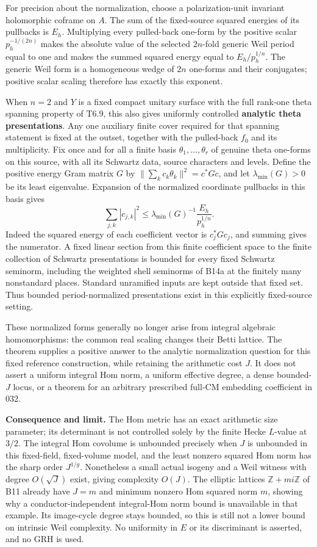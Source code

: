For precision about the normalization, choose a polarization-unit invariant holomorphic coframe on \(A\). The sum of the fixed-source squared energies of its pullbacks is \(E_h\). Multiplying every pulled-back one-form by the positive scalar \(p_h^{-1/(2n)}\) makes the absolute value of the selected \(2n\)-fold generic Weil period equal to one and makes the summed squared energy equal to \(E_h/p_h^{1/n}\). The generic Weil form is a homogeneous wedge of \(2n\) one-forms and their conjugates; positive scalar scaling therefore has exactly this exponent.

When \(n=2\) and \(Y\) is a fixed compact unitary surface with the full rank-one theta spanning property of T6.9, this also gives uniformly controlled \textbf{analytic theta presentations}. Any one auxiliary finite cover required for that spanning statement is fixed at the outset, together with the pulled-back \(f_0\) and its multiplicity. Fix once and for all a finite basis \(\theta_1,\ldots,\theta_r\) of genuine theta one-forms on this source, with all its Schwartz data, source characters and levels. Define the positive energy Gram matrix \(G\) by \(\|\sum_k c_k\theta_k\|^2=c^*Gc\), and let \(\lambda_{\min}(G)>0\) be its least eigenvalue. Expansion of the normalized coordinate pullbacks in this basis gives \[
 \sum_{j,k}|c_{j,k}|^2
 \le \lambda_{\min}(G)^{-1}\frac{E_h}{p_h^{1/n}}.
\tag{B19.16}
\] Indeed the squared energy of each coefficient vector is \(c_j^*Gc_j\), and summing gives the numerator. A fixed linear section from this finite coefficient space to the finite collection of Schwartz presentations is bounded for every fixed Schwartz seminorm, including the weighted shell seminorms of B14a at the finitely many nonstandard places. Standard unramified inputs are kept outside that fixed set. Thus bounded period-normalized presentations exist in this explicitly fixed-source setting.

These normalized forms generally no longer arise from integral algebraic homomorphisms: the common real scaling changes their Betti lattice. The theorem supplies a positive answer to the analytic normalization question for this fixed reference construction, while retaining the arithmetic cost \(J\). It does not assert a uniform integral Hom norm, a uniform effective degree, a dense bounded-\(J\) locus, or a theorem for an arbitrary prescribed full-CM embedding coefficient in 032.

\textbf{Consequence and limit.} The Hom metric has an exact arithmetic size parameter; its determinant is not controlled solely by the finite Hecke \(L\)-value at \(3/2\). The integral Hom covolume is unbounded precisely when \(J\) is unbounded in this fixed-field, fixed-volume model, and the least nonzero squared Hom norm has the sharp order \(J^{1/g}\). Nonetheless a small actual isogeny and a Weil witness with degree \(O(\sqrt J)\) exist, giving complexity \(O(J)\). The elliptic lattices \(\mathbb Z+mi\mathbb Z\) of B11 already have \(J=m\) and minimum nonzero Hom squared norm \(m\), showing why a conductor-independent integral-Hom norm bound is unavailable in that example. Its image-cycle degree stays bounded, so this is still not a lower bound on intrinsic Weil complexity. No uniformity in \(E\) or its discriminant is asserted, and no GRH is used.

